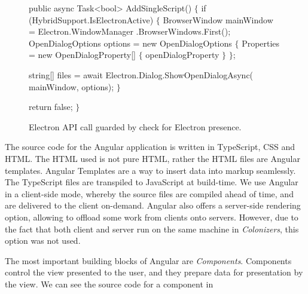 
\begin{figure}[ht]
\begin{code}[commandchars=\\\{\},codes={\catcode`\$=3\catcode`\^=7\catcode`\_=8}]
public async Task<bool> AddSingleScript()
$\{$
    if (HybridSupport.IsElectronActive)
    $\{$
        BrowserWindow mainWindow = Electron.WindowManager
            .BrowserWindows.First();
        OpenDialogOptions options = new OpenDialogOptions
        $\{$
            Properties = new OpenDialogProperty[] $\{$
                    openDialogProperty
                $\}$
        $\}$;

        string[] files = await Electron.Dialog.ShowOpenDialogAsync(
            mainWindow, options);
    $\}$

    return false;
$\}$
\end{code}
\caption{Electron API call guarded by check for Electron presence.}\label{dd:electronguard}
\end{figure}

The source code for the Angular application is written in TypeScript, CSS and HTML.
The HTML used is not pure HTML, rather the HTML files are Angular templates.
Angular Templates are a way to insert data into markup seamlessly.
The TypeScript files are transpiled to JavaScript at build-time.
We use Angular in a client-side mode, whereby the source files are compiled
ahead of time, and are delivered to the client on-demand. Angular also
offers a server-side rendering option, allowing to offload some work
from clients onto servers. However, due to the fact that both client and server
run on the same machine in \emph{Colonizers}, this option was not used.

The most important building blocks of Angular are \emph{Components}.
Components control the view presented to the user, and they prepare
data for presentation by the view. We can see the source code for a component
in 


